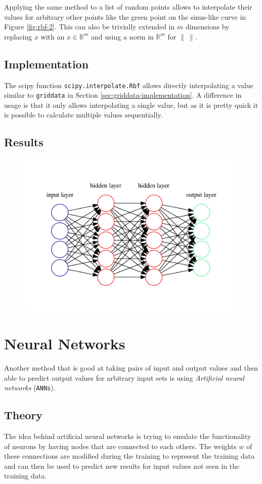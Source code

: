 Applying the same method to a list of random points allows to interpolate their values for arbitrary other points like the green point on the sinus-like curve in Figure \ref{fig:rbf-2}. This can also be trivially extended in $m$ dimensions by replacing $x$ with an $x\in\mathbb{R}^m$ and using a norm in $\mathbb{R}^m$ for $\left\|\ \right\|$.

\subsection{Implementation}

The scipy function \texttt{scipy.interpolate.Rbf} allows directly interpolating a value similar to \texttt{griddata} in Section \ref{sec:griddata-implementation}. A difference in usage is that it only allows interpolating a single value, but as it is pretty quick it is possible to calculate multiple values sequentially.

\subsection{Results}

\begin{figure}[h] %
	\centering
	\includegraphics[width=0.4\linewidth]{images/graphviz/general.pdf}
	\caption{}
	\label{fig:neuralnetwork-general}
\end{figure}

\section{Neural Networks}

Another method that is good at taking pairs of input and output values and then able to predict output values for arbitrary input sets is using \textit{Artificial neural networks} (\texttt{ANNs}).

\subsection{Theory}

The idea behind artificial neural networks is trying to emulate the functionality of neurons by having nodes that are connected to each others. The weights $w$ of these connections are modified during the training to represent the training data and can then be used to predict new results for input values not seen in the training data.

